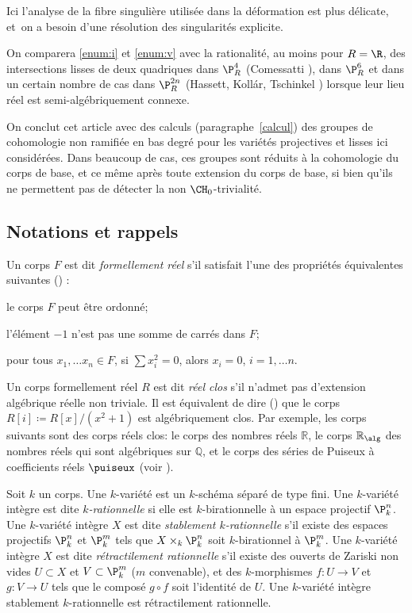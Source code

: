 Ici l'analyse de la fibre singulière utilisée dans la déformation est plus délicate, et~on a besoin d'une résolution des singularités explicite.

On comparera \eqref{enum:i} et \eqref{enum:v} avec la rationalité, au moins pour $R=\R$, des intersections lisses de deux quadriques dans $\P^4_R$ (Comessatti \cite{comessatti1912fondamenti}), dans $\P^6_{R}$ et dans
un certain nombre de cas dans $\P^{2n}_R$ (Hassett, Kollár, Tschinkel \cite{hassett2022rationality}) lorsque leur lieu réel est semi-algébriquement connexe.

On conclut cet article avec des calculs (paragraphe~\ref{calcul}) des groupes de cohomologie non ramifiée en bas degré pour les variétés projectives et lisses ici considérées. Dans beaucoup de cas, ces groupes sont réduits à la cohomologie du corps de base, et ce même
après toute extension du corps de base,
si bien qu'ils ne permettent pas de détecter la non $\CH_0$-trivialité.

\subsection*{Notations et rappels}
Un corps $F$ est dit {\it formellement réel} s'il satisfait l'une des propriétés équivalentes suivantes (\cf \cite[Th.\,1.1.8]{bochnak1998real}) :
\begin{enumeratei}
\item
le corps $F$ peut être ordonné;
\item
l'élément $-1$ n'est pas une somme de carrés dans $F$;
\item
pour tous $x_1,\ldots x_n\in F$, si $\sum x_i^2=0$, alors $x_i=0$, $i=1,\ldots n$.
\end{enumeratei}

Un corps formellement réel $R$ est dit {\it réel clos} s'il n'admet pas d'extension algébrique réelle non triviale. Il est équivalent de dire (\cf \cite[Th.\,1.2.2]{bochnak1998real}) que le corps $R[i]\coloneqq R[x]/(x^2+1)$ est algébriquement clos.
Par exemple, les corps suivants sont des corps réels clos: le corps des nombres réels $\mathbb R$, le corps $\mathbb R_{\alg}$ des nombres réels qui sont algébriques sur $\mathbb Q$, et le corps des séries de Puiseux à coefficients réels $\puiseux$ (voir \cite[Ex.\,1.2.3]{bochnak1998real}).

\medskip

Soit $k$ un corps.
Une $k$-variété est un $k$-schéma séparé de type fini. Une $k$-variété intègre
est dite {\it $k$-rationnelle} si elle est $k$-birationnelle à un espace projectif $\P^n_{k}$.
Une $k$-variété intègre $X$ est dite {\it stablement $k$-rationnelle} s'il existe des espaces projectifs
$\P^n_{k}$ et $\P^m_{k}$ tels que $X \times_{k}\P^n_{k}$ soit $k$-birationnel à $\P^m_{k}$.
Une $k$-variété intègre $X$ est dite {\it rétractilement rationnelle}
s'il existe des ouverts de Zariski non vides $U \subset X$ et $V \subset \P^m_{k}$ ($m$ convenable),
et des $k$-morphismes $ f \colon U \to V$ et $g \colon V \to U$ tels que le composé $g \circ f$ soit l'identité de $U$.
Une $k$-variété intègre stablement $k$-rationnelle est rétractilement rationnelle.

